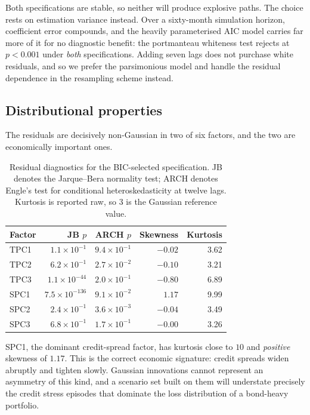 \documentclass[11pt,a4paper]{article}
\begin{document}
Both specifications are stable, so neither will produce explosive paths. The
choice rests on estimation variance instead. Over a sixty-month simulation
horizon, coefficient error compounds, and the heavily parameterised AIC model
carries far more of it for no diagnostic benefit: the portmanteau whiteness test
rejects at $p < 0.001$ under \emph{both} specifications. Adding seven lags does
not purchase white residuals, and so we prefer the parsimonious model and handle
the residual dependence in the resampling scheme instead.

\subsection{Distributional properties}

The residuals are decisively non-Gaussian in two of six factors, and the two are
economically important ones.

\begin{table}[htbp]
\centering
\caption{Residual diagnostics for the BIC-selected specification. JB denotes the
Jarque--Bera normality test; ARCH denotes Engle's test for conditional
heteroskedasticity at twelve lags. Kurtosis is reported raw, so $3$ is the
Gaussian reference value.}
\label{tab:diag}
\begin{tabular}{lrrrr}
\toprule
Factor & JB $p$ & ARCH $p$ & Skewness & Kurtosis \\
\midrule
TPC1 & $1.1\times10^{-1}$   & $9.4\times10^{-1}$   & $-0.02$ & 3.62 \\
TPC2 & $6.2\times10^{-1}$   & $2.7\times10^{-2}$   & $-0.10$ & 3.21 \\
TPC3 & $1.1\times10^{-44}$  & $2.0\times10^{-1}$   & $-0.80$ & 6.89 \\
SPC1 & $7.5\times10^{-136}$ & $9.1\times10^{-2}$   & $ 1.17$ & 9.99 \\
SPC2 & $2.4\times10^{-1}$   & $3.6\times10^{-3}$   & $-0.04$ & 3.49 \\
SPC3 & $6.8\times10^{-1}$   & $1.7\times10^{-1}$   & $-0.00$ & 3.26 \\
\bottomrule
\end{tabular}
\end{table}

SPC1, the dominant credit-spread factor, has kurtosis close to $10$ and
\emph{positive} skewness of $1.17$. This is the correct economic signature:
credit spreads widen abruptly and tighten slowly. Gaussian innovations cannot
represent an asymmetry of this kind, and a scenario set built on them will
understate precisely the credit stress episodes that dominate the loss
distribution of a bond-heavy portfolio.
\end{document}
